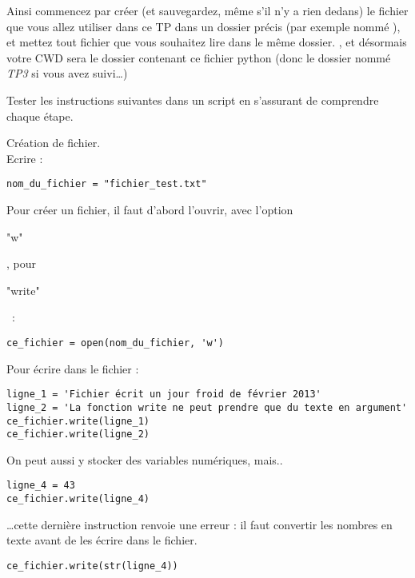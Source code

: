 {\begin{itemize}
	      Ainsi  commencez par créer (et sauvegardez, même s'il n'y a rien dedans) le fichier que vous allez utiliser dans ce TP dans un dossier précis (par exemple nommé ), et mettez tout  fichier que vous souhaitez lire dans le même dossier. , et désormais votre CWD sera le dossier contenant ce fichier python (donc le dossier nommé {\em TP3} si vous avez suivi\dots)

\end{itemize}
}

\exo

\begin{enonce}
	[Premiers pas]

	Tester les instructions suivantes dans un script en s'assurant de comprendre chaque étape.

	\ques	Création de fichier.\\

	Ecrire :
	\begin{verbatim}nom_du_fichier = "fichier_test.txt"\end{verbatim}

	Pour créer un fichier, il faut d'abord l'ouvrir, avec l'option \begin{texttt}"w"\end{texttt}, pour \begin{texttt}"write"\end{texttt} :\\

	\begin{verbatim}ce_fichier = open(nom_du_fichier, 'w')\end{verbatim}


	Pour écrire dans le fichier :

	\begin{verbatim}ligne_1 = 'Fichier écrit un jour froid de février 2013'
ligne_2 = 'La fonction write ne peut prendre que du texte en argument'
ce_fichier.write(ligne_1)
ce_fichier.write(ligne_2)
\end{verbatim}

	On peut aussi y stocker des variables numériques, mais..

	\begin{verbatim}
ligne_4 = 43
ce_fichier.write(ligne_4)
\end{verbatim}


	\dots cette dernière instruction renvoie une erreur : il faut convertir les nombres en texte avant de les écrire dans le fichier.

	\begin{verbatim}
ce_fichier.write(str(ligne_4))
\end{verbatim}


\end{enonce}
